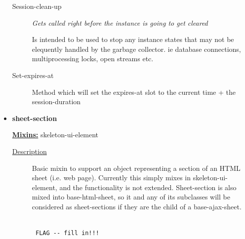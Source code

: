 \documentclass [11pt]{book}
\begin{document}
\begin{itemize}
\begin{description}
\item [Session-clean-up]
\emph{Gets called right before the instance is going to get cleared}

 Is intended to be used to stop any instance states that may not be elequently handled by the garbage collector. ie database connections, multiprocessing locks, open streams etc.




\item [Set-expires-at]

Method which will set the expires-at slot to the current time + the session-duration




\end{description}







\item {}
\label{prim:sheet-section}
\textbf{sheet-section}


\textbf{
\underline{Mixins:}} skeleton-ui-element





\begin{description}

\item [
\underline{Description}]


Basic mixin to support an object 
representing a section of an HTML sheet (i.e. web page). Currently 
this simply mixes in skeleton-ui-element, and the functionality is not 
extended. Sheet-section is also mixed into base-html-sheet, so it and 
any of its subclasses will be considered as sheet-sections if they 
are the child of a base-ajax-sheet.





\end{description}




\begin{figure}
\begin{lrbox}{\boxedverb}
\begin{minipage}{\linewidth}
{\small

\begin{verbatim}

 FLAG -- fill in!!!




\end{verbatim}}
\end{minipage}
\end{lrbox}
\end{figure}
\end{itemize}
\end{document}
